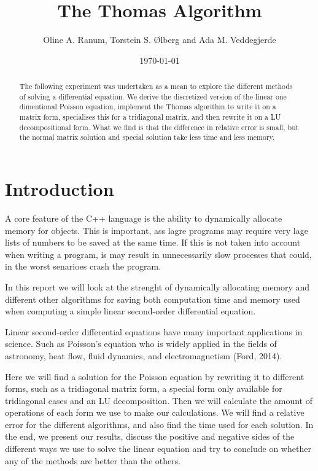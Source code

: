 \documentclass[%
reprint,
amsmath,amssymb,
aps,
]{revtex4-1}
\begin{document}
\title{The Thomas Algorithm}
\author{Oline A. Ranum, Torstein S. Ølberg and Ada M. Veddegjerde}
\date{\today}


\begin{abstract}
	The following experiment was undertaken as a mean to explore the different methods of solving a differential equation. We derive the discretized version of the linear one dimentional Poisson equation, implement the Thomas algorithm to write it on a matrix form, specialises this for a tridiagonal matrix, and then rewrite it on a LU decompositional form. What we find is that the difference in relative error is small, but the normal matrix solution and special solution take less time and less memory.

\end{abstract}
\maketitle

\section*{Introduction}

A core feature of the C++ language is the ability to dynamically allocate memory for objects. This is important, ass lagre programs may require very lage lists of numbers to be saved at the same time. If this is not taken into account when writing a program, is may result in unnecessarily slow processes that could, in the worst senarioes crash the program.

In this report we will look at the strenght of dynamically allocating memory and different other algorithms for saving both computation time and memory used when computing a simple linear second-order differential equation.

Linear second-order differential equations have many important applications in science. Such as Poisson's equation who is widely applied in the fields of astronomy, heat flow, fluid dynamics, and electromagnetism (Ford, 2014).

Here we will find a solution for the Poisson equation by rewriting it to different forms, such as a tridiagonal matrix form, a special form only available for tridiagonal cases and an LU decomposition. Then we will calculate the amount of operations of each form we use to make our calculations. We will find a relative error for the different algorithms, and also find the time used for each solution. In the end, we present our results, discuss the positive and negative sides of the different ways we use to solve the linear equation and try to conclude on whether any of the methods are better than the others.
\end{document}
